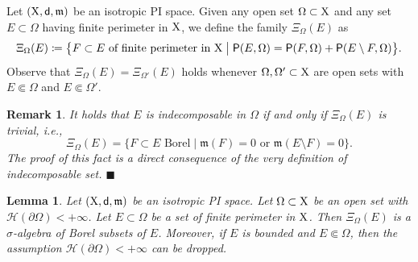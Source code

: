 \documentclass[reqno]{amsart}
\numberwithin{equation}{section}
\newcommand{\X}{{\rm X}}
\newcommand{\sfd}{{\sf d}}
\newcommand{\mm}{\mathfrak m}
\newcommand{\1}{\mathbbm 1}
\renewcommand{\P}{{\sf P}}
\renewcommand{\H}{{\mathcal H}}
\newcommand{\fr}{\penalty-20\null\hfill\(\blacksquare\)}
\newtheorem{lemma}[theorem]{Lemma}
\newtheorem{remark}[theorem]{Remark}
\begin{document}
Let \((\X,\sfd,\mm)\) be an isotropic PI space. Given any open set
\(\Omega\subset\X\) and any set \(E\subset\Omega\)
having finite perimeter in \(\X\), we define the family \(\Xi_\Omega(E)\) as
\[
\Xi_\Omega(E)\coloneqq\big\{F\subset E\text{ of finite perimeter in }\X
\;\big|\;\P(E,\Omega)=\P(F,\Omega)+\P(E\setminus F,\Omega)\big\}.
\]
Observe that \(\Xi_\Omega(E)=\Xi_{\Omega'}(E)\) holds whenever
\(\Omega,\Omega'\subset\X\) are open sets with \(E\Subset\Omega\)
and \(E\Subset\Omega'\).
%
%
\begin{remark}\label{rmk:indec_vs_Xi}{\rm
It holds that \(E\) is indecomposable in \(\Omega\) if and only if
\(\Xi_\Omega(E)\) is trivial, i.e.,
\[
\Xi_\Omega(E)=\big\{F\subset E\text{ Borel}\;\big|\;\mm(F)=0\text{ or }
\mm(E\setminus F)=0\big\}.
\]
The proof of this fact is a direct consequence of the very definition of indecomposable set.
\fr}\end{remark}
%
%
\begin{lemma}
Let \((\X,\sfd,\mm)\) be an isotropic PI space. Let \(\Omega\subset\X\) be an
open set with \(\H(\partial\Omega)<+\infty\). Let \(E\subset\Omega\) be a set of finite
perimeter in \(\X\). Then \(\Xi_\Omega(E)\) is a \(\sigma\)-algebra of Borel
subsets of \(E\). Moreover, if \(E\) is bounded and \(E\Subset\Omega\), then the assumption
\(\H(\partial\Omega)<+\infty\) can be dropped.
\end{lemma}
\end{document}
